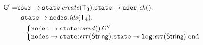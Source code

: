 \noindent
\begin{align*}
\G' = & 
\mathtt{user} \to \mathtt{state}{:}\mathit{create}(\T_3).
\mathtt{state} \to \mathtt{user}{:}\mathit{ok}().\\
& \hspace{2mm}
\mathtt{state}\to\mathtt{nodes}{:}\mathit{ids}(\T_4). \\
& \hspace{4mm}
\left\{
\begin{array}{@{}l@{}}
\mathtt{nodes}\to \mathtt{state}{:}\mathit{rsrvd}().\G''\\
\mathtt{nodes}\to \mathtt{state}{:}\mathit{err}(\mathsf{String}).\mathtt{state}\twoheadrightarrow\mathtt{log}{:}\mathit{err}(\mathsf{String}).\tend
\end{array} \right.
\end{align*}

